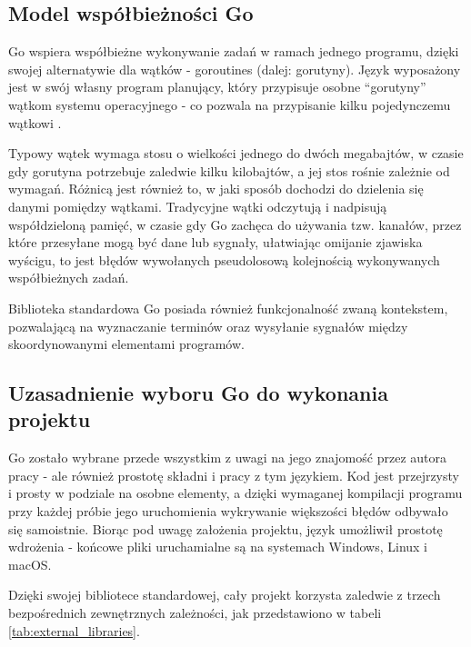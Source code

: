 \subsection{Model współbieżności Go}
Go wspiera współbieżne wykonywanie zadań w ramach jednego programu, dzięki swojej alternatywie dla wątków - goroutines (dalej: gorutyny). Język wyposażony jest w swój własny program planujący, który przypisuje osobne \enquote{gorutyny} wątkom systemu operacyjnego - co pozwala na przypisanie kilku pojedynczemu wątkowi \parencite{go_faq}.

Typowy wątek wymaga stosu o wielkości jednego do dwóch megabajtów, w czasie gdy gorutyna potrzebuje zaledwie kilku kilobajtów, a jej stos rośnie zależnie od wymagań. Różnicą jest również to, w jaki sposób dochodzi do dzielenia się danymi pomiędzy wątkami. Tradycyjne wątki odczytują i nadpisują współdzieloną pamięć, w czasie gdy Go zachęca do używania tzw. kanałów, przez które przesyłane mogą być dane lub sygnały, ułatwiając omijanie zjawiska wyścigu, to jest błędów wywołanych pseudolosową kolejnością wykonywanych współbieżnych zadań.

Biblioteka standardowa Go posiada również funkcjonalność zwaną kontekstem, pozwalającą na wyznaczanie terminów oraz wysyłanie sygnałów między skoordynowanymi elementami programów.

\subsection{Uzasadnienie wyboru Go do wykonania projektu}
Go zostało wybrane przede wszystkim z uwagi na jego znajomość przez autora pracy - ale również prostotę składni i pracy z tym językiem. Kod jest przejrzysty i prosty w podziale na osobne elementy, a dzięki wymaganej kompilacji programu przy każdej próbie jego uruchomienia wykrywanie większości błędów odbywało się samoistnie. Biorąc pod uwagę założenia projektu, język umożliwił prostotę wdrożenia - końcowe pliki uruchamialne są na systemach Windows, Linux i macOS. 

Dzięki swojej bibliotece standardowej, cały projekt korzysta zaledwie z trzech bezpośrednich zewnętrznych zależności, jak przedstawiono w tabeli \ref{tab:external_libraries}.


